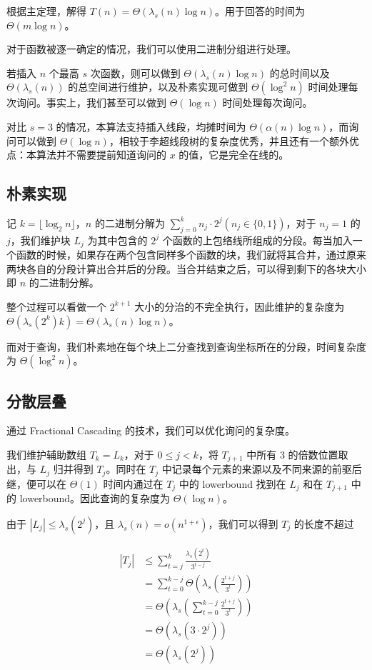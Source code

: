 \documentclass{noithesis}
\begin{document}
根据主定理，解得 $T(n) = \Theta(\lambda_s(n) \log n)$。用于回答的时间为 $\Theta(m\log n)$。

对于函数被逐一确定的情况，我们可以使用二进制分组进行处理。

若插入 $n$ 个最高 $s$ 次函数，则可以做到 $\Theta(\lambda_s(n)\log n)$ 的总时间以及 $\Theta(\lambda_s(n))$ 的总空间进行维护，以及朴素实现可做到 $\Theta(\log^2 n)$ 时间处理每次询问。事实上，我们甚至可以做到 $\Theta(\log n)$ 时间处理每次询问。

对比 $s=3$ 的情况，本算法支持插入线段，均摊时间为 $\Theta(\alpha(n)\log n)$，而询问可以做到 $\Theta(\log n)$，相较于李超线段树的复杂度优秀，并且还有一个额外优点：本算法并不需要提前知道询问的 $x$ 的值，它是完全在线的。

\subsection{朴素实现}

记 $k = \lfloor\log_2 n \rfloor$，$n$ 的二进制分解为 $\sum_{j=0}^k n_j \cdot 2^j (n_j \in \{0, 1\})$，对于 $n_j=1$ 的 $j$，我们维护块 $L_j$ 为其中包含的 $2^j$ 个函数的上包络线所组成的分段。每当加入一个函数的时候，如果存在两个包含同样多个函数的块，我们就将其合并，通过原来两块各自的分段计算出合并后的分段。当合并结束之后，可以得到剩下的各块大小即 $n$ 的二进制分解。

整个过程可以看做一个 $2^{k+1}$ 大小的分治的不完全执行，因此维护的复杂度为 $\Theta(\lambda_s(2^k)k) = \Theta(\lambda_s(n)\log n)$。

而对于查询，我们朴素地在每个块上二分查找到查询坐标所在的分段，时间复杂度为 $\Theta(\log^2 n)$。

\subsection{分散层叠}

通过 Fractional Cascading 的技术，我们可以优化询问的复杂度。

我们维护辅助数组 $T_k = L_k$，对于 $0\le j< k$，将 $T_{j+1}$ 中所有 3 的倍数位置取出，与 $L_j$ 归并得到 $T_j$。同时在 $T_j$ 中记录每个元素的来源以及不同来源的前驱后继，便可以在 $\Theta(1)$ 时间内通过在 $T_j$ 中的 lowerbound 找到在 $L_j$ 和在 $T_{j+1}$ 中的 lowerbound。因此查询的复杂度为 $\Theta(\log n)$。

由于 $|L_j| \le \lambda_s(2^j)$，且 $\lambda_s(n) = o(n^{1+\epsilon})$，我们可以得到 $T_j$ 的长度不超过

\begin{align*}
|T_j| & \le \sum_{t = j}^k \frac{\lambda_s(2^t)}{3^{t-j}} \\
    & = \sum_{t=0}^{k - j} \Theta\left(\lambda_s \left(\frac{2^{t+j}}{3^t}\right)\right) \\
    & = \Theta \left( \lambda_s \left( \sum_{t=0}^{k-j} \frac{2^{t+j}}{3^t} \right) \right)\\
    & = \Theta(\lambda_s(3\cdot 2^j)) \\
    & = \Theta(\lambda_s(2^j))
\end{align*}
\end{document}
